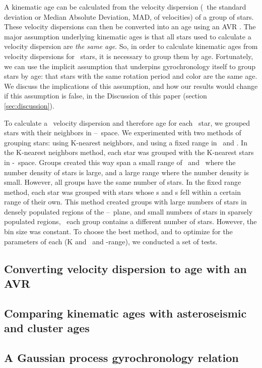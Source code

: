 A kinematic age can be calculated from the velocity dispersion (\eg\ the
standard deviation or Median Absolute Deviation, MAD, of velocities) of a
group of stars.
These velocity dispersions can then be converted into an age using an AVR
\citep[\eg][]{holmberg2009, yu2018}.
The major assumption underlying kinematic ages is that all stars used to
calculate a velocity dispersion are {\it the same age}.
So, in order to calculate kinematic ages from velocity dispersions for
\kepler\ stars, it is necessary to group them by age.
Fortunately, we can use the implicit assumption that underpins gyrochronology
itself to group stars by age: that stars with the same rotation period and
color are the same age.
We discuss the implications of this assumption, and how our results would
change if this assumption is false, in the Discussion of this paper (section
\ref{sec:discussion}).

To calculate a \vz\ velocity dispersion and therefore age for each \kepler\
star, we grouped stars with their neighbors in
\logp--\teff\ space.
We experimented with two methods of grouping stars: using K-nearest neighbors,
and using a fixed range in \logp\ and \teff.
In the K-nearest neighbors method, each star was grouped with the K-nearest
stars in \logp-\teff\ space.
Groups created this way span a small range of \logp\ and \teff\ where the
number density of stars is large, and a large range where the number density
is small.
However, all groups have the same number of stars.
In the fixed range method, each star was grouped with stars whose \logp s and
\teff s fell within a certain range of their own.
This method created groups with large numbers of stars in densely populated
regions of the \logp--\teff\ plane, and small numbers of stars in sparsely
populated regions, \ie\ each group contains a different number of stars.
However, the bin size was constant.
To choose the best method, and to optimize for the parameters of each (K and
\logp\ and \teff-range), we conducted a set of tests.

\subsection{Converting velocity dispersion to age with an AVR}
\label{sec:avr}

\subsection{Comparing kinematic ages with asteroseismic and cluster ages}


\subsection{A Gaussian process gyrochronology relation}
\label{sec:gp_model}

